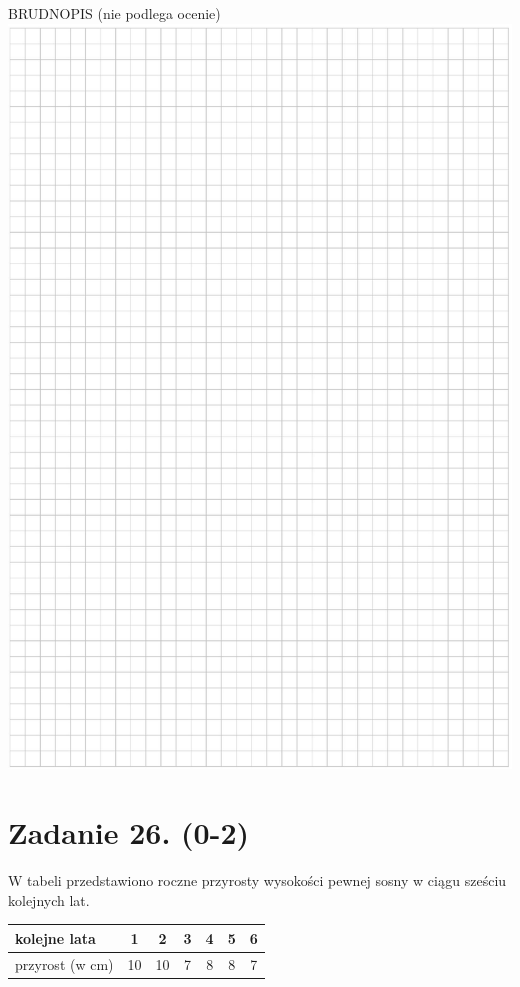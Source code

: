 \documentclass[10pt]{article}
\begin{document}
BRUDNOPIS (nie podlega ocenie)\\
\includegraphics[max width=\textwidth, center]{2024_11_21_1c92fcc0db78c9202015g-11}

\section*{Zadanie 26. (0-2)}
W tabeli przedstawiono roczne przyrosty wysokości pewnej sosny w ciągu sześciu kolejnych lat.

\begin{center}
\begin{tabular}{|l|c|c|c|c|c|c|}
\hline
kolejne lata & 1 & 2 & 3 & 4 & 5 & 6 \\
\hline
przyrost (w cm) & 10 & 10 & 7 & 8 & 8 & 7 \\
\hline
\end{tabular}
\end{center}
\end{document}
